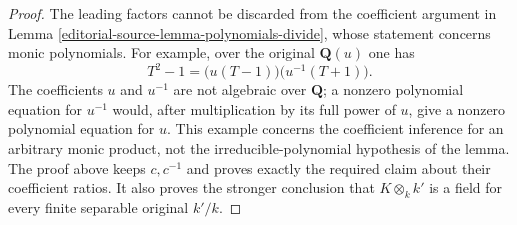 \begin{proof}
The leading factors cannot be discarded
from the coefficient argument in Lemma
\ref{editorial-source-lemma-polynomials-divide}, whose
statement concerns monic polynomials.
For example, over the original
$\mathbf Q(u)$ one has
$$
T^2-1=\bigl(u(T-1)\bigr)\bigl(u^{-1}(T+1)\bigr).
$$
The coefficients $u$ and $u^{-1}$
are not algebraic over $\mathbf Q$;
a nonzero polynomial equation for
$u^{-1}$ would, after multiplication
by its full power of $u$, give a
nonzero polynomial equation for $u$.
This example concerns the coefficient
inference for an arbitrary monic
product, not the irreducible-polynomial
hypothesis of the lemma. The proof
above keeps $c,c^{-1}$ and proves
exactly the required claim about
their coefficient ratios. It also
proves the stronger conclusion that
$K\otimes_k k'$ is a field for every
finite separable original $k'/k$.
\end{proof}